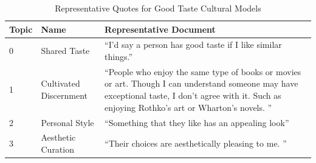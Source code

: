 \begin{table}[htpb]
\centering
\footnotesize
\begin{tabular}{lp{3.5cm}p{10cm}}
\toprule
Topic & Name & Representative Document \\
\midrule
0 & Shared Taste & ``I’d say a person has good taste if I like similar things.'' \\
1 & Cultivated Discernment & ``People who enjoy the same type of books or movies or art.  Though I can understand someone may have exceptional taste, I don't agree with it.  Such as enjoying Rothko's art or Wharton's novels.  '' \\
2 & Personal Style & ``Something that they like has an appealing look'' \\
3 & Aesthetic Curation & ``Their choices are aesthetically pleasing to me. '' \\
\bottomrule
\end{tabular}
\caption{Representative Quotes for Good Taste Cultural Models}
\label{tab:good_taste_rep_docs}
\end{table}
